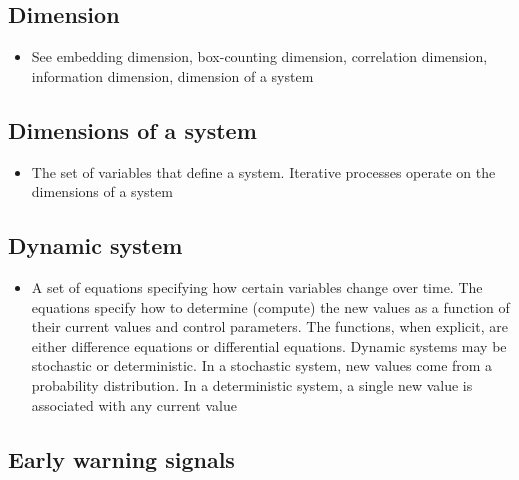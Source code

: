 \documentclass[12pt,]{book}
\providecommand{\tightlist}{%
  \setlength{\itemsep}{0pt}\setlength{\parskip}{0pt}}
\begin{document}
\hypertarget{Dime20}{%
\subsection*{\texorpdfstring{\textbf{Dimension}}{Dimension}}\label{Dime20}}

\begin{itemize}
\tightlist
\item
  See embedding dimension, box-counting dimension, correlation dimension, information dimension, dimension of a system
\end{itemize}

\hypertarget{Dime21}{%
\subsection*{\texorpdfstring{\textbf{Dimensions of a system}}{Dimensions of a system}}\label{Dime21}}

\begin{itemize}
\tightlist
\item
  The set of variables that define a system. Iterative processes operate on the dimensions of a system
\end{itemize}

\hypertarget{Dyna22}{%
\subsection*{\texorpdfstring{\textbf{Dynamic system}}{Dynamic system}}\label{Dyna22}}

\begin{itemize}
\tightlist
\item
  A set of equations specifying how certain variables change over time. The equations specify how to determine (compute) the new values as a function of their current values and control parameters. The functions, when explicit, are either difference equations or differential equations. Dynamic systems may be stochastic or deterministic. In a stochastic system, new values come from a probability distribution. In a deterministic system, a single new value is associated with any current value
\end{itemize}

\hypertarget{Earl23}{%
\subsection*{\texorpdfstring{\textbf{Early warning signals}}{Early warning signals}}\label{Earl23}}
\end{document}
